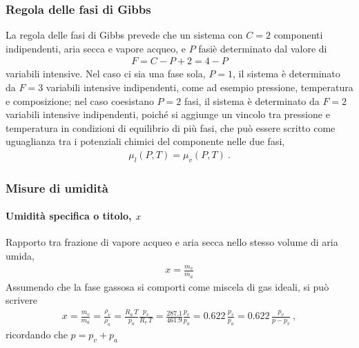 \documentclass[letterpaper,10pt,italian]{jupyterBook}
\begin{document}
\subsubsection{Regola delle fasi di Gibbs}
\label{\detokenize{ch/thermodynamics/humid-air:regola-delle-fasi-di-gibbs}}
\sphinxAtStartPar
La regola delle fasi di Gibbs prevede che un sistema con \(C=2\) componenti indipendenti, aria secca e vapore acqueo, e \(P\) fasiè determinato dal valore di
\begin{equation*}
\begin{split}F = C - P + 2 = 4 - P \end{split}
\end{equation*}
\sphinxAtStartPar
variabili intensive. Nel caso ci sia una fase sola, \(P=1\), il sistema è determinato da \(F = 3\) variabili intensive indipendenti, come ad esempio pressione, temperatura e composizione; nel caso coesistano \(P=2\) fasi, il sistema è determinato da \(F = 2\) variabili intensive indipendenti, poiché si aggiunge un vincolo tra pressione e temperatura in condizioni di equilibrio di più fasi, che può essere scritto come uguaglianza tra i potenziali chimici del componente nelle due fasi,
\begin{equation*}
\begin{split}\mu_{l}(P,T) = \mu_{v}(P,T) \ .\end{split}
\end{equation*}

\subsubsection{Misure di umidità}
\label{\detokenize{ch/thermodynamics/humid-air:misure-di-umidita}}

\paragraph{Umidità specifica o titolo, \protect\(x\protect\)}
\label{\detokenize{ch/thermodynamics/humid-air:umidita-specifica-o-titolo-x}}
\sphinxAtStartPar
Rapporto tra frazione di vapore acqueo e aria secca nello stesso volume di aria umida,
\begin{equation*}
\begin{split}x = \frac{m_v}{m_a}\end{split}
\end{equation*}
\sphinxAtStartPar
Assumendo che la fase gassosa si comporti come miscela di gas ideali, si può scrivere
\begin{equation*}
\begin{split}x = \frac{m_v}{m_a} = \frac{\rho_v}{\rho_a} = \frac{R_a \, T}{p_a} \frac{p_v}{R_v \, T} = \frac{287.1}{461.9} \frac{p_v}{p_a} = 0.622 \, \frac{p_v}{p_a} = 0.622 \, \frac{p_v}{p - p_v} \ ,\end{split}
\end{equation*}
\sphinxAtStartPar
ricordando che \(p = p_v + p_a\)
\end{document}
